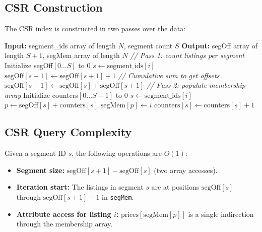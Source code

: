 \documentclass[11pt,a4paper,twoside]{book}
\begin{document}
\subsection{CSR Construction}

The CSR index is constructed in two passes over the data:

\begin{algorithm}[H]
\caption{CSR Index Construction}
\label{alg:csrbuild}
\begin{algorithmic}[1]
\State \textbf{Input:} segment\_ids array of length $N$, segment count $S$
\State \textbf{Output:} segOff array of length $S+1$, segMem array of length $N$
\State
\State \textit{// Pass 1: count listings per segment}
\State Initialize segOff$[0 \ldots S]$ to 0
    \State $s \gets \text{segment\_ids}[i]$
    \State $\text{segOff}[s+1] \gets \text{segOff}[s+1] + 1$
\EndFor
\State
\State \textit{// Cumulative sum to get offsets}
    \State $\text{segOff}[s+1] \gets \text{segOff}[s] + \text{segOff}[s+1]$
\EndFor
\State
\State \textit{// Pass 2: populate membership array}
\State Initialize counters$[0 \ldots S-1]$ to 0
    \State $s \gets \text{segment\_ids}[i]$
    \State $p \gets \text{segOff}[s] + \text{counters}[s]$
    \State $\text{segMem}[p] \gets i$
    \State $\text{counters}[s] \gets \text{counters}[s] + 1$
\EndFor
\end{algorithmic}
\end{algorithm}

\subsection{CSR Query Complexity}

Given a segment ID $s$, the following operations are $O(1)$:

\begin{itemize}[leftmargin=*]
    \item \textbf{Segment size:} $\text{segOff}[s+1] - \text{segOff}[s]$ (two array accesses).
    \item \textbf{Iteration start:} The listings in segment $s$ are at positions
          $\text{segOff}[s]$ through $\text{segOff}[s+1]-1$ in \texttt{segMem}.
    \item \textbf{Attribute access for listing $i$:} $\text{prices}[\text{segMem}[p]]$ is a
          single indirection through the membership array.
\end{itemize}
\end{document}
